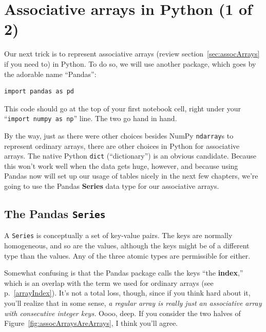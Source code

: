 

\chapter{\huge Associative arrays in Python (1 of 2)}
\label{ch:pythonAssocArrays}


Our next trick is to represent associative arrays (review
section~\ref{sec:assocArrays} if you need to) in Python. To do so, we will
use another package, which goes by the adorable name ``Pandas'':

\begin{Verbatim}[fontsize=\small,samepage=true,frame=single,framesep=3mm]
import pandas as pd
\end{Verbatim}

This code should go at the top of your first notebook cell, right under your
``\texttt{import numpy as np}'' line. The two go hand in hand.


By the way, just as there were other choices besides NumPy \texttt{ndarray}s to
represent ordinary arrays, there are other choices in Python for associative
arrays. The native Python \texttt{dict} (``dictionary'') is an obvious
candidate. Because this won't work well when the data gets huge, however, and
because using Pandas now will set up our usage of tables nicely in the next
few chapters, we're going to use the Pandas \textbf{Series} data type for our
associative arrays.


\section{The Pandas \texttt{Series}}
\label{sec:creatingSeries}


A \texttt{Series} is conceptually a set of key-value pairs. The keys are
normally homogeneous, and so are the values, although the keys might be of a
different type than the values. Any of the three atomic types are permissible
for either.


Somewhat confusing is that the Pandas package calls the keys ``the
\textbf{index},'' which is an overlap with the term we used for ordinary arrays
(see p.~\ref{arrayIndex}). It's not a total loss, though, since if you think
hard about it, you'll realize that in some sense, \textit{a regular array is
really just an associative array with consecutive integer keys.} Oooo, deep. If
you consider the two halves of Figure~\ref{fig:assocArraysAreArrays}, I think
you'll agree.

